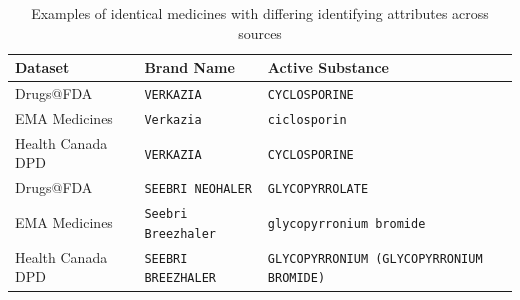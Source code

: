 \documentclass[a4paper,oneside]{scrbook}
\begin{document}
\begin{table}[htbp]
\centering
\caption{Examples of identical medicines with differing identifying attributes across sources}
\label{tab:difficult_match}
\footnotesize
\begin{tabularx}{\textwidth}{|l|l|X|}
\hline
\textbf{Dataset} & \textbf{Brand Name} & \textbf{Active Substance} \\
\hline
Drugs@FDA & \texttt{VERKAZIA} & \texttt{CYCLOSPORINE} \\
EMA Medicines & \texttt{Verkazia} & \texttt{ciclosporin} \\
Health Canada DPD & \texttt{VERKAZIA} & \texttt{CYCLOSPORINE} \\
\hline
Drugs@FDA & \texttt{SEEBRI NEOHALER} & \texttt{GLYCOPYRROLATE} \\
EMA Medicines & \texttt{Seebri Breezhaler} & \texttt{glycopyrronium bromide} \\
Health Canada DPD & \texttt{SEEBRI BREEZHALER} & \texttt{GLYCOPYRRONIUM (GLYCOPYRRONIUM BROMIDE)} \\
\hline
\end{tabularx}
\end{table}
\end{document}
